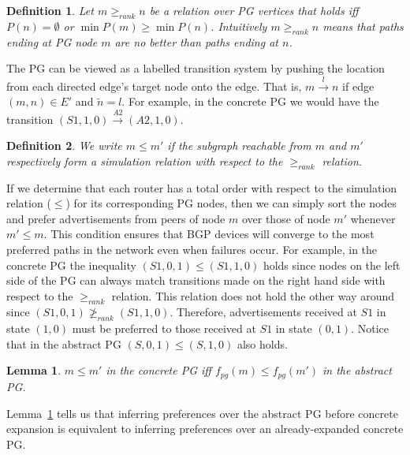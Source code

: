 \documentclass[numbers, 10pt, preprint]{sigplanconf}
\newtheorem{defn}{Definition}[section]
\newtheorem{lem}[thm]{Lemma}
\begin{document}
\begin{defn}
Let $m \geq_{rank} n$ be a relation over PG vertices that holds iff $P(n) = \emptyset$ or $\min P(m) \geq \min P(n)$. Intuitively $m \geq_{rank} n$ means that paths ending at PG node $m$ are no better than paths ending at $n$.
%
\end{defn}
\noindent
%

The PG can be viewed as a labelled transition system by pushing the location from each directed edge's target node onto the edge. That is, $m\overset{l}{\rightarrow}n$ if edge $(m,n) \in E'$ and $\tilde{n} = l$.
%
For example, in the concrete PG we would have the transition $(S1,1,0)\overset{A2}{\rightarrow}(A2,1,0)$.

\begin{defn}
We write $m \leq m'$ if the subgraph reachable from $m$ and $m'$ respectively form a simulation relation with respect to the $\geq_{rank}$ relation.
\end{defn}

If we determine that each router has a total order with respect to the simulation relation ($\leq$) for its corresponding PG nodes, then we can simply sort the nodes and prefer advertisements from peers of node $m$ over those of node $m'$ whenever $m' \leq m$. This condition ensures that BGP devices will converge to the most preferred paths in the network even when failures occur.
%
For example, in the concrete PG the inequality $(S1,0,1) \leq (S1,1,0)$ holds since nodes on the left side of the PG can always match transitions made on the right hand side with respect to the $\geq_{rank}$ relation. This relation does not hold the other way around since $(S1,0,1) \ngeq_{rank} (S1,1,0)$. Therefore, advertisements received at $S1$ in state $(1,0)$ must be preferred to those received at $S1$ in state $(0,1)$.
%
Notice that in the abstract PG $(S,0,1) \leq (S,1,0)$ also holds.

\begin{lem}
\label{lem:preference}
$m \leq m'$ in the concrete PG iff $f_{pg}(m) \leq f_{pg}(m')$ in the abstract PG.
\end{lem}

Lemma~\ref{lem:preference} tells us that inferring preferences over the abstract PG before concrete expansion is equivalent to inferring preferences over an already-expanded concrete PG.
\end{document}
